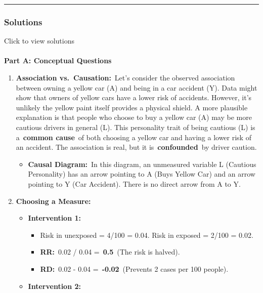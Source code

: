 \documentclass[
  10pt,
  letterpaper,
  DIV=11,
  numbers=noendperiod]{scrartcl}
\makeatletter
\let\oldparagraph\paragraph
\renewcommand{\paragraph}{
    \@ifstar
      \xxxParagraphStar
      \xxxParagraphNoStar
  }
\newcommand{\xxxParagraphStar}[1]{\oldparagraph*{#1}\mbox{}}
\newcommand{\xxxParagraphNoStar}[1]{\oldparagraph{#1}\mbox{}}
\providecommand{\tightlist}{%
  \setlength{\itemsep}{0pt}\setlength{\parskip}{0pt}}
\makeatother
\begin{document}
\begin{center}\rule{0.5\linewidth}{0.5pt}\end{center}

\subsubsection{Solutions}\label{solutions-1}

Click to view solutions

\paragraph{\texorpdfstring{\textbf{Part A: Conceptual
Questions}}{Part A: Conceptual Questions}}\label{part-a-conceptual-questions-3}

\begin{enumerate}
\def\labelenumi{\arabic{enumi}.}
\item
  \textbf{Association vs.~Causation:}~Let's consider the observed
  association between owning a yellow car (A) and being in a car
  accident (Y). Data might show that owners of yellow cars have a lower
  risk of accidents. However, it's unlikely the yellow paint itself
  provides a physical shield. A more plausible explanation is that
  people who choose to buy a yellow car (A) may be more cautious drivers
  in general (L). This personality trait of being cautious (L) is
  a~\textbf{common cause}~of both choosing a yellow car and having a
  lower risk of an accident. The association is real, but it
  is~\textbf{confounded}~by driver caution.

  \begin{itemize}
  \tightlist
  \item
    \textbf{Causal Diagram:}~In this diagram, an unmeasured variable L
    (Cautious Personality) has an arrow pointing to A (Buys Yellow Car)
    and an arrow pointing to Y (Car Accident). There is no direct arrow
    from A to Y.
  \end{itemize}
\item
  \textbf{Choosing a Measure:}

  \begin{itemize}
  \item
    \textbf{Intervention 1:}

    \begin{itemize}
    \item
      Risk in unexposed = 4/100 = 0.04. Risk in exposed = 2/100 = 0.02.
    \item
      \textbf{RR:}~0.02 / 0.04 =~\textbf{0.5}~(The risk is halved).
    \item
      \textbf{RD:}~0.02 - 0.04 =~\textbf{-0.02}~(Prevents 2 cases per
      100 people).
    \end{itemize}
  \item
    \textbf{Intervention 2:}


\end{itemize}
\end{enumerate}
\end{document}
